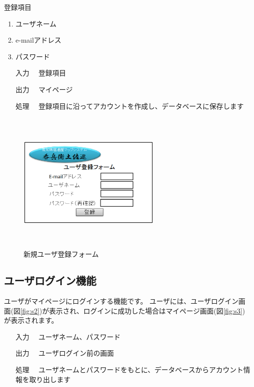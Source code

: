 \documentclass[a4j,titlepage]{jarticle}
\begin{document}
登録項目
\begin{enumerate}
  \item ユーザネーム
  \item e-mailアドレス
  \item パスワード
\end{enumerate}

\begin{enumerate}
  \item [入力]　登録項目
  \item [出力]　マイページ
  \item [処理]　登録項目に沿ってアカウントを作成し、データベースに保存します
\end{enumerate}

\begin{figure}[htbp]
  \begin{center}
  \includegraphics [height=7cm, width=7cm]{extrnal1_design_document_image/s1.eps}
  \caption{新規ユーザ登録フォーム}
  \label {fig:s1}
  \end{center}
\end{figure}

\newpage
\subsection{ユーザログイン機能}
ユーザがマイページにログインする機能です。
ユーザには、ユーザログイン画面(図\ref{fig:s2})が表示され、ログインに成功した場合はマイページ画面(図\ref{fig:s3})が表示されます。

\begin{enumerate}
  \item [入力]　ユーザネーム、パスワード
  \item [出力]　ユーザログイン前の画面
  \item [処理]　ユーザネームとパスワードをもとに、データベースからアカウント情報を取り出します
\end{enumerate}
\end{document}
